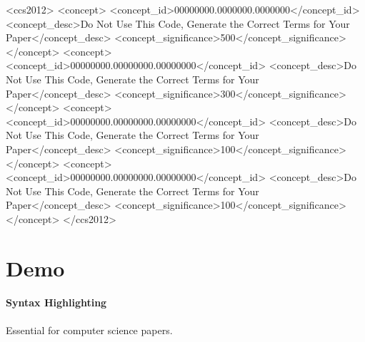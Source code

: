 \documentclass[acmsmall,natbib=false]{acmart}
\begin{document}
\begin{CCSXML}
    <ccs2012>
    <concept>
    <concept_id>00000000.0000000.0000000</concept_id>
    <concept_desc>Do Not Use This Code, Generate the Correct Terms for Your Paper</concept_desc>
    <concept_significance>500</concept_significance>
    </concept>
    <concept>
    <concept_id>00000000.00000000.00000000</concept_id>
    <concept_desc>Do Not Use This Code, Generate the Correct Terms for Your Paper</concept_desc>
    <concept_significance>300</concept_significance>
    </concept>
    <concept>
    <concept_id>00000000.00000000.00000000</concept_id>
    <concept_desc>Do Not Use This Code, Generate the Correct Terms for Your Paper</concept_desc>
    <concept_significance>100</concept_significance>
    </concept>
    <concept>
    <concept_id>00000000.00000000.00000000</concept_id>
    <concept_desc>Do Not Use This Code, Generate the Correct Terms for Your Paper</concept_desc>
    <concept_significance>100</concept_significance>
    </concept>
    </ccs2012>
\end{CCSXML}




\maketitle

\section{Demo}

\paragraph{Syntax Highlighting} Essential for computer science papers.
\end{document}
